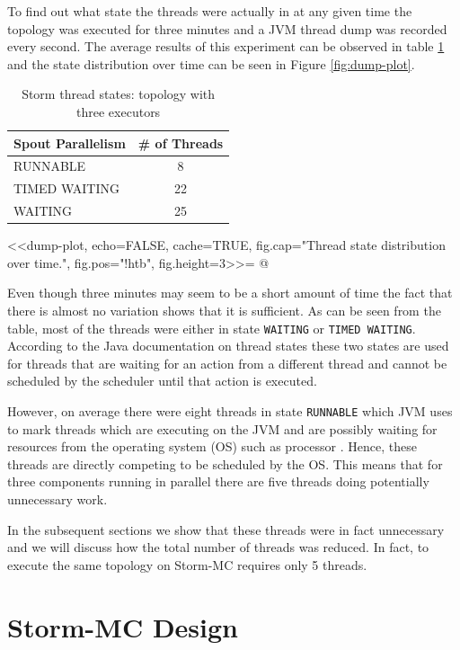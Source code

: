 To find out what state the threads were actually in at any given time the topology was executed for three minutes and a JVM thread dump was recorded every second. The average results of this experiment can be observed in table \ref{table:dump} and the state distribution over time can be seen in Figure \ref{fig:dump-plot}.

\begin{table}[htb!]
\centering
\small
\begin{tabular}{@{}lc@{}}
    \textbf{Spout Parallelism} & \textbf{\# of Threads} \\ \toprule
    RUNNABLE & 8  \\
	TIMED WAITING & 22  \\
    WAITING & 25  \\
\end{tabular}
\caption[Storm thread states]{Storm thread states: topology with three executors}
\label{table:dump}
\end{table}

<<dump-plot, echo=FALSE, cache=TRUE, fig.cap="Thread state distribution over time.", fig.pos="!htb", fig.height=3>>=
@

Even though three minutes may seem to be a short amount of time the fact that there is almost no variation shows that it is sufficient. As can be seen from the table, most of the threads were either in state \texttt{WAITING} or \texttt{TIMED WAITING}. According to the Java documentation on thread states \citep{JavaThreads} these two states are used for threads that are waiting for an action from a different thread and cannot be scheduled by the scheduler until that action is executed.

However, on average there were eight threads in state \texttt{RUNNABLE} which JVM uses to mark threads which are executing on the JVM and are possibly waiting for resources from the operating system (OS) such as processor \citep{JavaThreads}. Hence, these threads are directly competing to be scheduled by the OS. This means that for three components running in parallel there are five threads doing potentially unnecessary work.

In the subsequent sections we show that these threads were in fact unnecessary and we will discuss how the total number of threads was reduced. In fact, to execute the same topology on Storm-MC requires only 5 threads.

\section{Storm-MC Design}
\label{sec:storm_mc_arch}

